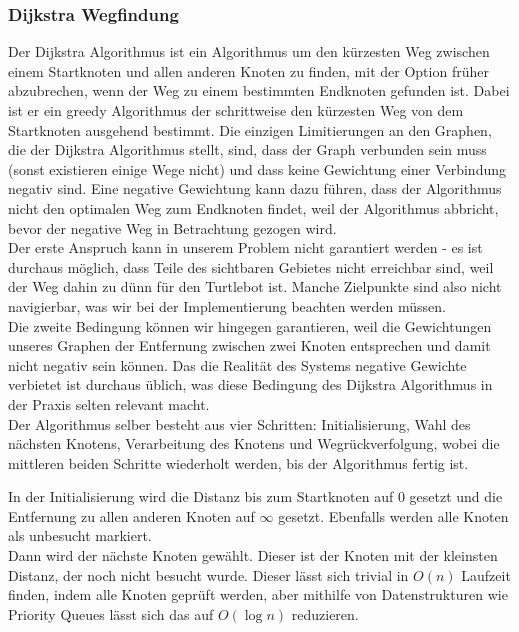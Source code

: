 \subsubsection{Dijkstra Wegfindung}
Der Dijkstra Algorithmus ist ein Algorithmus um den kürzesten Weg zwischen einem Startknoten und allen anderen Knoten
zu finden, mit der Option früher abzubrechen, wenn der Weg zu einem bestimmten Endknoten gefunden ist.
Dabei ist er ein greedy Algorithmus der schrittweise den kürzesten Weg von dem Startknoten ausgehend bestimmt.
Die einzigen Limitierungen an den Graphen, die der Dijkstra Algorithmus stellt, sind, dass der Graph verbunden sein muss
(sonst existieren einige Wege nicht) und dass keine Gewichtung einer Verbindung negativ sind.
Eine negative Gewichtung kann dazu führen, dass der Algorithmus nicht den optimalen Weg zum Endknoten findet, weil der Algorithmus abbricht, bevor der negative
Weg in Betrachtung gezogen wird.\\

Der erste Anspruch kann in unserem Problem nicht garantiert werden - es ist durchaus möglich, dass Teile des sichtbaren
Gebietes nicht erreichbar sind, weil der Weg dahin zu dünn für den Turtlebot ist.
Manche Zielpunkte sind also nicht navigierbar, was wir bei der Implementierung beachten werden müssen.\\

Die zweite Bedingung können wir hingegen garantieren, weil die Gewichtungen unseres Graphen der Entfernung zwischen
zwei Knoten entsprechen und damit nicht negativ sein können.
Das die Realität des Systems negative Gewichte verbietet ist durchaus üblich, was diese Bedingung des Dijkstra Algorithmus
in der Praxis selten relevant macht.\\



Der Algorithmus selber besteht aus vier Schritten: Initialisierung, Wahl des nächsten Knotens, Verarbeitung des Knotens und Wegrückverfolgung,
wobei die mittleren beiden Schritte wiederholt werden, bis der Algorithmus fertig ist.

In der Initialisierung wird die Distanz bis zum Startknoten auf 0 gesetzt und die Entfernung zu allen anderen Knoten auf
$\infty$ gesetzt.
Ebenfalls werden alle Knoten als unbesucht markiert.\\

Dann wird der nächste Knoten gewählt.
Dieser ist der Knoten mit der kleinsten Distanz, der noch nicht besucht wurde.
Dieser lässt sich trivial in $O(n)$ Laufzeit finden, indem alle Knoten geprüft werden, aber mithilfe von Datenstrukturen
wie Priority Queues lässt sich das auf $O(\log n)$ reduzieren.\\

